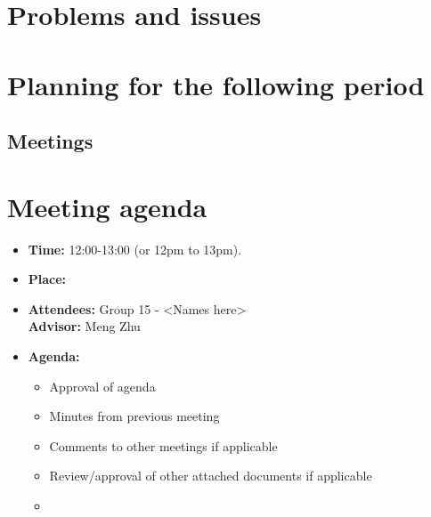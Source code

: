 \documentclass[12pt, a4paper]{article}
\begin{document}
\section{Problems and issues}

\section{Planning for the following period}
\subsection{Meetings}
\newpage
\section{Meeting agenda }
\begin{itemize}
\item \textbf{Time:} 12:00-13:00 (or 12pm to 13pm).
\item \textbf{Place:} \\
\item \textbf{Attendees:} Group 15 - <Names here> \\ \textbf{Advisor:} Meng Zhu
\item \textbf{Agenda:} 
	\begin{itemize}
	\item Approval of agenda
	\item Minutes from previous meeting
	\item Comments to other meetings if applicable
	\item Review/approval of other attached documents if applicable
	\item <add other agenda items here>
	\end{itemize}
\end{itemize}
\end{document}
